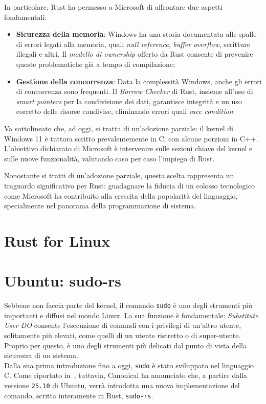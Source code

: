 In particolare, Rust ha permesso a Microsoft di affrontare due aspetti fondamentali:
\begin{itemize}
    \item \textbf{Sicurezza della memoria}: Windows ha una storia documentata alle spalle di errori legati alla memoria, quali \textit{null reference}, \textit{buffer overflow}, scritture illegali e altri. Il \textit{modello di ownership} offerto da Rust consente di prevenire queste problematiche già a tempo di compilazione;
    \item \textbf{Gestione della concorrenza}: Data la complessità Windows, anche gli errori di concorrenza sono frequenti. Il \textit{Borrow Checker} di Rust, insieme all'uso di \textit{smart pointers} per la condivisione dei dati, garantisce integrità e un uso corretto delle risorse condivise, eliminando errori quali \textit{race condition}.
\end{itemize}
Va sottolineato che, ad oggi, si tratta di un'adozione parziale: il kernel di Windows 11 è tuttora scritto prevalentemente in C, con alcune porzioni in C++.
L'obiettivo dichiarato di Microsoft è intervenire sulle sezioni chiave del kernel e sulle nuove funzionalità, valutando caso per caso l'impiego di Rust.

Nonostante si tratti di un'adozione parziale, questa scelta rappresenta un traguardo significativo per Rust: guadagnare la fiducia
di un colosso tecnologico come Microsoft ha contribuito alla crescita della popolarità del linguaggio, specialmente nel panorama della programmazione di sistema.

\section{Rust for Linux}

\section{Ubuntu: sudo-rs}
Sebbene non faccia parte del kernel, il comando \texttt{sudo} è uno degli strumenti più importanti e diffusi nel mondo Linux.
La sua funzione è fondamentale: \textit{Substitute User DO} consente l'esecuzione di comandi con i privilegi di un'altro utente, solitamente più elevati,
come quelli di un utente ristretto o di super-utente.
Proprio per questo, è uno degli strumenti più delicati dal punto di vista della sicurezza di un sistema. \hfill
\vspace{5pt}\\
\noindent Dalla sua prima introduzione fino a oggi, \texttt{sudo} è stato sviluppato nel linguaggio C. Come riportato in~\cite{ubuntu-sudo-rs}, tuttavia, Canonical ha annunciato che,
a partire dalla versione \texttt{25.10} di Ubuntu, verrà introdotta una nuova implementazione del comando, scritta interamente in Rust, \texttt{sudo-rs}.


